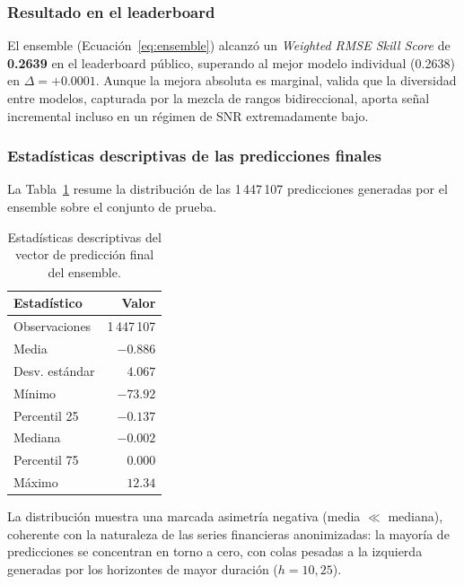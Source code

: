 \documentclass{article}
\begin{document}
\subsubsection{Resultado en el leaderboard}

El ensemble (Ecuación~\ref{eq:ensemble}) alcanzó un \emph{Weighted RMSE Skill Score} de \textbf{0.2639} en el leaderboard público, superando al mejor modelo individual (0.2638) en $\Delta = +0.0001$. Aunque la mejora absoluta es marginal, valida que la diversidad entre modelos, capturada por la mezcla de rangos bidireccional, aporta señal incremental incluso en un régimen de SNR extremadamente bajo.

\subsubsection{Estadísticas descriptivas de las predicciones finales}

La Tabla~\ref{tab:stats} resume la distribución de las 1\,447\,107 predicciones generadas por el ensemble sobre el conjunto de prueba.

\begin{table}[h!]
  \caption{Estadísticas descriptivas del vector de predicción final del ensemble.}
  \label{tab:stats}
  \centering
  \begin{tabular}{lr}
    \toprule
    Estadístico & Valor \\
    \midrule
    Observaciones   & 1\,447\,107 \\
    Media           & $-0.886$ \\
    Desv. estándar  & $4.067$ \\
    Mínimo          & $-73.92$ \\
    Percentil 25    & $-0.137$ \\
    Mediana         & $-0.002$ \\
    Percentil 75    & $\phantom{-}0.000$ \\
    Máximo          & $\phantom{-}12.34$ \\
    \bottomrule
  \end{tabular}
\end{table}

La distribución muestra una marcada asimetría negativa (media $\ll$ mediana), coherente con la naturaleza de las series financieras anonimizadas: la mayoría de predicciones se concentran en torno a cero, con colas pesadas a la izquierda generadas por los horizontes de mayor duración ($h = 10, 25$).





\end{document}

